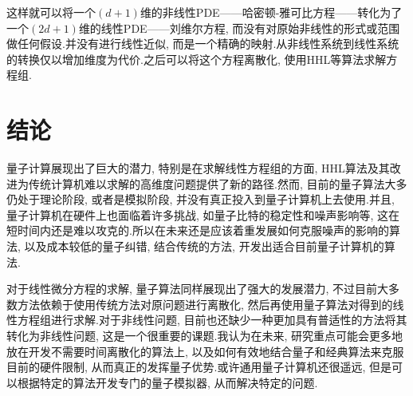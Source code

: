 这样就可以将一个$(d+1)$维的非线性PDE——哈密顿-雅可比方程——转化为了一个$(2d+1)$维的线性PDE——刘维尔方程, 而没有对原始非线性的形式或范围做任何假设.并没有进行线性近似, 而是一个精确的映射.从非线性系统到线性系统的转换仅以增加维度为代价.之后可以将这个方程离散化, 使用HHL等算法求解方程组.








\chapter{结论}
量子计算展现出了巨大的潜力, 特别是在求解线性方程组的方面, HHL算法及其改进为传统计算机难以求解的高维度问题提供了新的路径.然而, 目前的量子算法大多仍处于理论阶段, 或者是模拟阶段, 并没有真正投入到量子计算机上去使用.并且, 量子计算机在硬件上也面临着许多挑战, 如量子比特的稳定性和噪声影响等, 这在短时间内还是难以攻克的.所以在未来还是应该着重发展如何克服噪声的影响的算法, 以及成本较低的量子纠错, 结合传统的方法, 开发出适合目前量子计算机的算法.

对于线性微分方程的求解, 量子算法同样展现出了强大的发展潜力, 不过目前大多数方法依赖于使用传统方法对原问题进行离散化, 然后再使用量子算法对得到的线性方程组进行求解.对于非线性问题, 目前也还缺少一种更加具有普适性的方法将其转化为非线性问题, 这是一个很重要的课题.我认为在未来, 研究重点可能会更多地放在开发不需要时间离散化的算法上, 以及如何有效地结合量子和经典算法来克服目前的硬件限制, 从而真正的发挥量子优势.或许通用量子计算机还很遥远, 但是可以根据特定的算法开发专门的量子模拟器, 从而解决特定的问题.